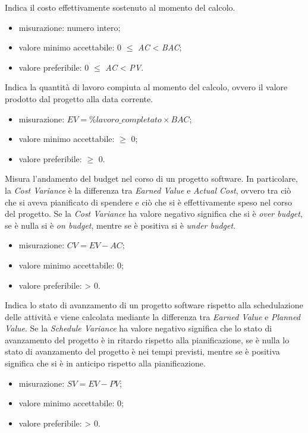 		Indica il costo effettivamente sostenuto al momento del calcolo.
		\begin{itemize}
			\item{misurazione: numero intero;}
			\item{valore minimo accettabile: 0 $\leq$ \textit{AC} < \textit{BAC};}
			\item{valore preferibile: 0 $\leq$ \textit{AC} < \textit{PV}.}
		\end{itemize}
		
		Indica la quantità di lavoro compiuta al momento del calcolo, ovvero il valore prodotto dal progetto alla data corrente.
		\begin{itemize}
			\item{misurazione: $EV = \%lavoro\_completato \times BAC$;}
			\item{valore minimo accettabile: $\geq$ 0;}
			\item{valore preferibile: $\geq$ 0.}
		\end{itemize}

		Misura l'andamento del budget nel corso di un progetto software. In particolare, la \textit{Cost Variance} è la differenza tra \textit{Earned Value} e \textit{Actual Cost}, ovvero tra ciò che si aveva pianificato di spendere e ciò che si è effettivamente speso nel corso del progetto.
		Se la \textit{Cost Variance} ha valore negativo significa che si è \textit{over budget}, se è nulla si è \textit{on budget}, mentre se è positiva si è \textit{under budget}.
		\begin{itemize}
			\item{misurazione: $CV = EV - AC$;}
			\item{valore minimo accettabile: 0;}
			\item{valore preferibile: > 0.}
		\end{itemize}
		
		Indica lo stato di avanzamento di un progetto software rispetto alla schedulazione delle attività e viene calcolata mediante la differenza tra \textit{Earned Value} e \textit{Planned Value}.
		Se la \textit{Schedule Variance} ha valore negativo significa che lo stato di avanzamento del progetto è in ritardo rispetto alla pianificazione, se è nulla lo stato di avanzamento del progetto è nei tempi previsti, mentre se è positiva significa che si è in anticipo rispetto alla pianificazione.
		\begin{itemize}
			\item{misurazione: $SV = EV - PV$;}
			\item{valore minimo accettabile: 0;}
			\item{valore preferibile: > 0.}
		\end{itemize}
						
